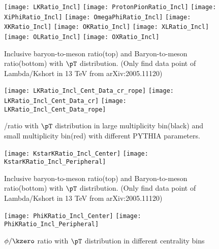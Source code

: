 \begin{figure}[ht]
        \begin{center}
                \texttt{[image: LKRatio\_Incl]}
                \texttt{[image: ProtonPionRatio\_Incl]}
                \texttt{[image: XiPhiRatio\_Incl]}
                \texttt{[image: OmegaPhiRatio\_Incl]}
                \texttt{[image: XKRatio\_Incl]}
                \texttt{[image: OKRatio\_Incl]}
                \texttt{[image: XLRatio\_Incl]}
                \texttt{[image: OLRatio\_Incl]}
                \texttt{[image: OXRatio\_Incl]}
        \end{center}
	\caption{Inclusive baryon-to-meson ratio(top) and Baryon-to-meson ratio(bottom) with $\pT$ distribution. (Only find data point of Lambda/Kshort in 13 TeV from arXiv:2005.11120)}
        \label{fig:InclParRatio}
\end{figure}

\begin{figure}[ht]
	\begin{center}
		\texttt{[image: LKRatio\_Incl\_Cent\_Data\_cr\_rope]}
		\texttt{[image: LKRatio\_Incl\_Cent\_Data\_cr]}
		\texttt{[image: LKRatio\_Incl\_Cent\_Data\_rope]}
	\end{center}
	\caption{\lmb/\kzero ratio with $\pT$ distribution in large multiplicity bin(black) and small multiplicity bin(red) with different PYTHIA parameters.}
	\label{fig:InclParRatioCent}
\end{figure}

\begin{figure}[ht]
	\begin{center}
		\texttt{[image: KstarKRatio\_Incl\_Center]}
		\texttt{[image: KstarKRatio\_Incl\_Peripheral]}
	\end{center}
  \caption{Inclusive baryon-to-meson ratio(top) and Baryon-to-meson ratio(bottom) with $\pT$ distribution. (Only find data point of Lambda/Kshort in 13 TeV from arXiv:2005.11120)}
  \label{fig:InclKstarKRatio}
\end{figure}

\begin{figure}[ht]
	\begin{center}
		\texttt{[image: PhiKRatio\_Incl\_Center]}
		\texttt{[image: PhiKRatio\_Incl\_Peripheral]}
	\end{center}
	\caption{$\phi/\kzero$ ratio with $\pT$ distribution in different centrality bins}
	\label{fig:InclPhiKRatio}
\end{figure}

